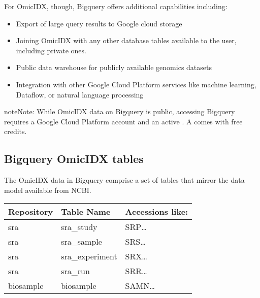 \documentclass[letterpaper,10pt,english]{sphinxmanual}
\begin{document}
For OmicIDX, though, Bigquery offers additional capabilities
including:
\begin{itemize}
\item {} 
Export of large query results to Google cloud storage

\item {} 
Joining OmicIDX with any other database tables available to the
user, including private ones.

\item {} 
Public data warehouse for publicly available genomics datasets

\item {} 
Integration with other Google Cloud Platform services like machine
learning, Dataflow, or natural language processing

\end{itemize}

\begin{sphinxadmonition}{note}{Note:}
While OmicIDX data on Bigquery is public, accessing Bigquery
requires a Google Cloud Platform account and an active . A  comes with free credits.
\end{sphinxadmonition}


\subsection{Bigquery OmicIDX tables}
\label{\detokenize{Bigquery:bigquery-omicidx-tables}}
The OmicIDX data in Bigquery comprise a set of tables that mirror the
data model available from NCBI.


\begin{savenotes}\sphinxattablestart
\centering
\begin{tabulary}{\linewidth}[t]{|T|T|T|}
\hline

Repository
&
Table Name
&
Accessions like:
\\
\hline
sra
&
sra\_study
&
SRP…
\\
\hline
sra
&
sra\_sample
&
SRS…
\\
\hline
sra
&
sra\_experiment
&
SRX…
\\
\hline
sra
&
sra\_run
&
SRR…
\\
\hline
biosample
&
biosample
&
SAMN…
\\
\hline
\end{tabulary}
\par
\sphinxattableend\end{savenotes}
\end{document}
